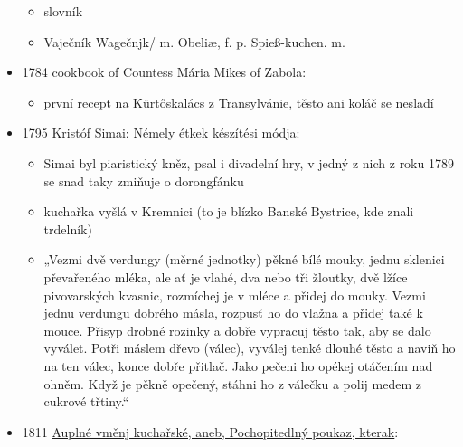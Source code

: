 \begin{itemize}
  \begin{itemize}
  \tightlist
  \item
    slovník
  \item
    Vaječník \textbar{} Wagečnjk/ m. Obeliæ, f. p. Spieß-kuchen. m.
  \end{itemize}
\item
  1784 cookbook of Countess Mária Mikes of Zabola:

  \begin{itemize}
  \tightlist
  \item
    první recept na Kürtőskalács z Transylvánie, těsto ani koláč se
    nesladí
  \end{itemize}
\item
  1795 Kristóf Simai: Némely étkek készítési módja:

  \begin{itemize}
  \tightlist
  \item
    Simai byl piaristický kněz, psal i divadelní hry, v jedný z nich z
    roku 1789 se snad taky zmiňuje o dorongfánku
  \item
    kuchařka vyšlá v Kremnici (to je blízko Banské Bystrice, kde znali
    trdelník)
  \item
    „Vezmi dvě verdungy (měrné jednotky) pěkné bílé mouky, jednu
    sklenici převařeného mléka, ale ať je vlahé, dva nebo tři žloutky,
    dvě lžíce pivovarských kvasnic, rozmíchej je v mléce a přidej do
    mouky. Vezmi jednu verdungu dobrého másla, rozpusť ho do vlažna a
    přidej také k mouce. Přisyp drobné rozinky a dobře vypracuj těsto
    tak, aby se dalo vyválet. Potři máslem dřevo (válec), vyválej tenké
    dlouhé těsto a naviň ho na ten válec, konce dobře přitlač. Jako
    pečeni ho opékej otáčením nad ohněm. Když je pěkně opečený, stáhni
    ho z válečku a polij medem z cukrové třtiny.``
  \end{itemize}
\item
  1811
  \href{https://ceskadigitalniknihovna.cz/view/uuid:e11769d0-4c42-11e7-aac4-005056827e51?page=uuid\%3A628a69f0-6565-11e7-94b3-005056825209&source=mzk}{Auplné
  vměnj kuchařské, aneb, Pochopitedlný poukaz, kterak}:


\end{itemize}

